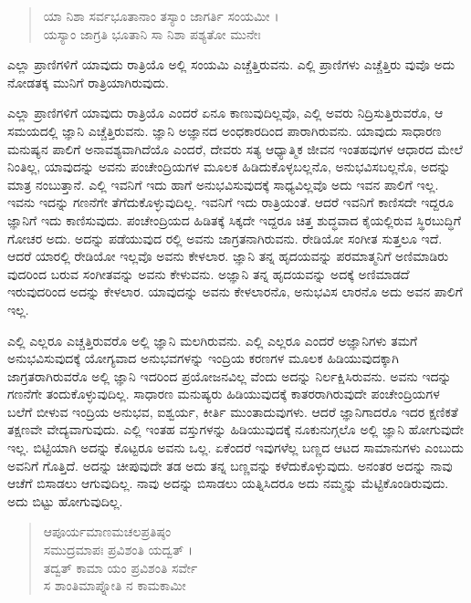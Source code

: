 \begin{verse}
ಯಾ ನಿಶಾ ಸರ್ವಭೂತಾನಾಂ ತಸ್ಯಾಂ ಜಾಗರ್ತಿ ಸಂಯಮೀ ।\\ಯಸ್ಯಾಂ ಜಾಗ್ರತಿ ಭೂತಾನಿ ಸಾ ನಿಶಾ ಪಶ್ಯತೋ ಮುನೇಃ 
\end{verse}

{\small ಎಲ್ಲಾ ಪ್ರಾಣಿಗಳಿಗೆ ಯಾವುದು ರಾತ್ರಿಯೊ ಅಲ್ಲಿ ಸಂಯಮಿ ಎಚ್ಚೆತ್ತಿರುವನು. ಎಲ್ಲಿ ಪ್ರಾಣಿಗಳು ಎಚ್ಚೆತ್ತಿರು ವುವೊ ಅದು ನೋಡತಕ್ಕ ಮುನಿಗೆ ರಾತ್ರಿಯಾಗಿರುವುದು.}

ಎಲ್ಲಾ ಪ್ರಾಣಿಗಳಿಗೆ ಯಾವುದು ರಾತ್ರಿಯೊ ಎಂದರೆ ಏನೂ ಕಾಣುವುದಿಲ್ಲವೊ, ಎಲ್ಲಿ ಅವರು ನಿದ್ರಿಸುತ್ತಿರುವರೊ, ಆ ಸಮಯದಲ್ಲಿ ಜ್ಞಾನಿ ಎಚ್ಚೆತ್ತಿರುವನು. ಜ್ಞಾನಿ ಅಜ್ಞಾನದ ಅಂಧಕಾರದಿಂದ ಪಾರಾಗಿರುವನು. ಯಾವುದು ಸಾಧಾರಣ ಮನುಷ್ಯನ ಪಾಲಿಗೆ ಅನಾವಶ್ಯವಾಗಿದೆಯೊ ಎಂದರೆ, ದೇವರು ಸತ್ಯ ಆಧ್ಯಾತ್ಮಿಕ ಜೀವನ ಇಂತಹವುಗಳ ಆಧಾರದ ಮೇಲೆ ನಿಂತಿಲ್ಲ, ಯಾವುದನ್ನು ಅವನು ಪಂಚೇಂದ್ರಿಯಗಳ ಮೂಲಕ ಹಿಡಿದುಕೊಳ್ಳಬಲ್ಲನೊ, ಅನುಭವಿಸಬಲ್ಲನೊ, ಅದನ್ನು ಮಾತ್ರ ನಂಬುತ್ತಾನೆ. ಎಲ್ಲಿ ಇವನಿಗೆ ಇದು ಹಾಗೆ ಅನುಭವಿಸುವುದಕ್ಕೆ ಸಾಧ್ಯವಿಲ್ಲವೊ ಅದು ಇವನ ಪಾಲಿಗೆ ಇಲ್ಲ. ಇವನು ಇದನ್ನು ಗಣನೆಗೇ ತೆಗೆದುಕೊಳ್ಳುವುದಿಲ್ಲ. ಇವನಿಗೆ ಇದು ರಾತ್ರಿಯಂತೆ. ಆದರೆ ಇವನಿಗೆ ಕಾಣಿಸದೇ ಇದ್ದರೂ ಜ್ಞಾನಿಗೆ ಇದು ಕಾಣಿಸುವುದು. ಪಂಚೇಂದ್ರಿಯದ ಹಿಡಿತಕ್ಕೆ ಸಿಕ್ಕದೇ ಇದ್ದರೂ ಚಿತ್ತ ಶುದ್ಧವಾದ ಕೈಯಲ್ಲಿರುವ ಸ್ಥಿರಬುದ್ಧಿಗೆ ಗೋಚರ ಅದು. ಅದನ್ನು ಪಡೆಯುವುದ ರಲ್ಲಿ ಅವನು ಜಾಗ್ರತನಾಗಿರುವನು. ರೇಡಿಯೋ ಸಂಗೀತ ಸುತ್ತಲೂ ಇದೆ. ಆದರೆ ಯಾರಲ್ಲಿ ರೇಡಿಯೋ ಇಲ್ಲವೊ ಅವನು ಕೇಳಲಾರ. ಜ್ಞಾನಿ ತನ್ನ ಹೃದಯವನ್ನು ಪರಮಾತ್ಮನಿಗೆ ಅಣಿಮಾಡಿರು ವುದರಿಂದ ಬರುವ ಸಂಗೀತವನ್ನು ಅವನು ಕೇಳುವನು. ಅಜ್ಞಾನಿ ತನ್ನ ಹೃದಯವನ್ನು ಅದಕ್ಕೆ ಅಣಿಮಾಡದೆ ಇರುವುದರಿಂದ ಅದನ್ನು ಕೇಳಲಾರ. ಯಾವುದನ್ನು ಅವನು ಕೇಳಲಾರನೊ, ಅನುಭವಿಸ ಲಾರನೊ ಅದು ಅವನ ಪಾಲಿಗೆ ಇಲ್ಲ.

ಎಲ್ಲಿ ಎಲ್ಲರೂ ಎಚ್ಚತ್ತಿರುವರೊ ಅಲ್ಲಿ ಜ್ಞಾನಿ ಮಲಗಿರುವನು. ಎಲ್ಲಿ ಎಲ್ಲರೂ ಎಂದರೆ ಅಜ್ಞಾನಿಗಳು ತಮಗೆ ಅನುಭವಿಸುವುದಕ್ಕೆ ಯೋಗ್ಯವಾದ ಅನುಭವಗಳನ್ನು ಇಂದ್ರಿಯ ಕರಣಗಳ ಮೂಲಕ ಹಿಡಿಯುವುದಕ್ಕಾಗಿ ಜಾಗ್ರತರಾಗಿರುವರೊ ಅಲ್ಲಿ ಜ್ಞಾನಿ ಇದರಿಂದ ಪ್ರಯೋಜನವಿಲ್ಲ ವೆಂದು ಅದನ್ನು ನಿರ್ಲಕ್ಷಿಸಿರುವನು. ಅವನು ಇದನ್ನು ಗಣನೆಗೇ ತಂದುಕೊಳ್ಳುವುದಿಲ್ಲ. ಸಾಧಾರಣ ಮನುಷ್ಯರು ಹಿಡಿಯುವುದಕ್ಕೆ ಕಾತರರಾಗಿರುವುದೇ ಪಂಚೇಂದ್ರಿಯಗಳ ಬಲೆಗೆ ಬೀಳುವ ಇಂದ್ರಿಯ ಅನುಭವ, ಐಶ್ವರ್ಯ, ಕೀರ್ತಿ ಮುಂತಾದುವುಗಳು. ಆದರೆ ಜ್ಞಾನಿಗಾದರೊ ಇದರ ಕ್ಷಣಿಕತೆ ತಕ್ಷಣವೇ ವೇದ್ಯವಾಗುವುದು. ಎಲ್ಲಿ ಇಂತಹ ವಸ್ತುಗಳನ್ನು ಹಿಡಿಯುವುದಕ್ಕೆ ನೂಕುನುಗ್ಗಲೊ ಅಲ್ಲಿ ಜ್ಞಾನಿ ಹೋಗುವುದೇ ಇಲ್ಲ. ಬಿಟ್ಟಿಯಾಗಿ ಅದನ್ನು ಕೊಟ್ಟರೂ ಅವನು ಒಲ್ಲ. ಏಕೆಂದರೆ ಇವುಗಳೆಲ್ಲ ಬಣ್ಣದ ಆಟದ ಸಾಮಾನುಗಳು ಎಂಬುದು ಅವನಿಗೆ ಗೊತ್ತಿದೆ. ಅದನ್ನು ಚೀಪುವುದೇ ತಡ ಅದು ತನ್ನ ಬಣ್ಣವನ್ನು ಕಳೆದುಕೊಳ್ಳುವುದು. ಅನಂತರ ಅದನ್ನು ನಾವು ಆಚೆಗೆ ಬಿಸಾಡಲು ಆಗುವುದಿಲ್ಲ. ನಾವು ಅದನ್ನು ಬಿಸಾಡಲು ಯತ್ನಿಸಿದರೂ ಅದು ನಮ್ಮನ್ನು ಮೆಟ್ಟಿಕೊಂಡಿರುವುದು. ಅದು ಬಿಟ್ಟು ಹೋಗುವುದಿಲ್ಲ.

\begin{verse}
ಆಪೂರ್ಯಮಾಣಮಚಲಪ್ರತಿಷ್ಠಂ\\ಸಮುದ್ರಮಾಪಃ ಪ್ರವಿಶಂತಿ ಯದ್ವತ್ ।\\ತದ್ವತ್ ಕಾಮಾ ಯಂ ಪ್ರವಿಶಂತಿ ಸರ್ವೇ\\ಸ ಶಾಂತಿಮಾಪ್ನೋತಿ ನ ಕಾಮಕಾಮೀ 
\end{verse}

